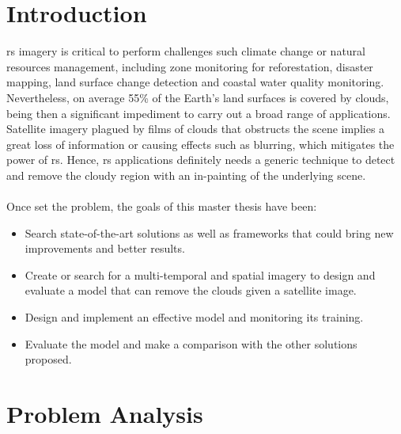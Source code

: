 \documentclass[11pt, a4paper]{article}
\begin{document}
	\section{Introduction} 
	\gls{rs} imagery is critical to perform challenges such climate change or natural resources management, including zone monitoring for reforestation, disaster mapping, land surface change detection and coastal water quality monitoring.  %
	Nevertheless, on average 55\% of the Earth's land surfaces is covered by clouds, being then a significant impediment to carry out a broad range of applications. Satellite imagery plagued by films of clouds that obstructs the scene implies a great loss of information or causing effects such as blurring, which mitigates the power of \gls{rs}. Hence, \gls{rs} applications definitely needs a generic technique to detect and remove the cloudy region with an in-painting of the underlying scene.
	\\
	\\
	Once set the problem, the goals of this master thesis have been:
	\begin{itemize}
		\item Search state-of-the-art solutions as well as frameworks that could bring new improvements and better results.
		\item Create or search for a multi-temporal and spatial imagery to design and evaluate a model that can remove the clouds given a satellite image.
		\item Design and implement an effective model and monitoring its training.
		\item Evaluate the model and make a comparison with the other solutions proposed.
	\end{itemize}

	\newpage
	\section{Problem Analysis}
\end{document}
